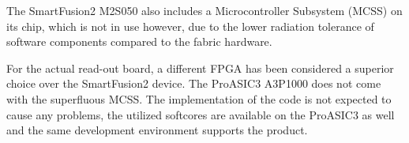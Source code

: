 The SmartFusion2 M2S050 also includes a Microcontroller Subsystem (MCSS) on its chip, which is not in use however, due to the lower radiation tolerance of software components compared to the fabric hardware.
\newline

For the actual read-out board, a different FPGA has been considered a superior choice over the SmartFusion2 device. The ProASIC3 A3P1000 does not come with the superfluous MCSS. The implementation of the code is not expected to cause any problems, the utilized softcores are available on the ProASIC3 as well and the same development environment supports the product.


